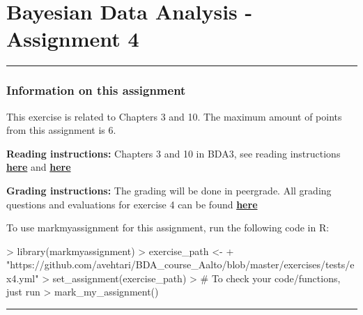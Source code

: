 \documentclass[11pt,a4paper,english]{article}
\newcommand{\HRule}{\rule{\linewidth}{0.5mm}}
\begin{document}


\section*{Bayesian Data Analysis - Assignment 4}



\HRule



\newpage

\subsubsection*{Information on this assignment}

This exercise is related to Chapters 3 and 10. The maximum amount of points from this assignment is 6.


\textbf{Reading instructions:} Chapters 3 and 10 in BDA3, see reading instructions \href{https://github.com/avehtari/BDA_course_Aalto/blob/master/chapter_notes/BDA_notes_ch3.pdf}{\textbf{here}} and \href{https://github.com/avehtari/BDA_course_Aalto/blob/master/chapter_notes/BDA_notes_ch10.pdf}{\textbf{here}}

\textbf{Grading instructions:} The grading will be done in peergrade. All grading questions and evaluations for exercise 4 can be found \href{https://github.com/avehtari/BDA_course_Aalto/blob/master/exercises/ex4_rubric.md}{\textbf{here}}

To use markmyassignment for this assignment, run the following code in R:
\begin{Schunk}
\begin{Sinput}
> library(markmyassignment)
> exercise_path <- 
+   "https://github.com/avehtari/BDA_course_Aalto/blob/master/exercises/tests/ex4.yml"
> set_assignment(exercise_path)
> # To check your code/functions, just run
> mark_my_assignment()
\end{Sinput}
\end{Schunk}


\HRule

\newpage
\end{document}
